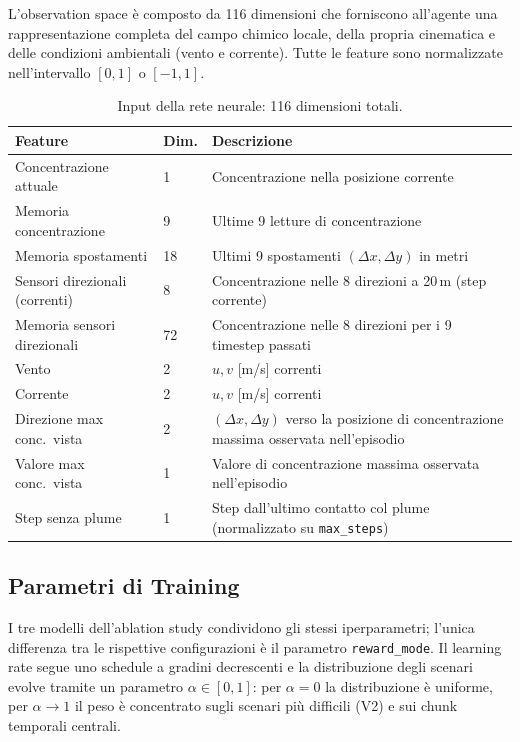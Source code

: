 \documentclass[12pt, a4paper]{article}
\begin{document}
L'observation space \`e composto da 116 dimensioni che forniscono all'agente
una rappresentazione completa del campo chimico locale, della propria cinematica
e delle condizioni ambientali (vento e corrente).
Tutte le feature sono normalizzate nell'intervallo $[0,1]$ o $[-1,1]$.

\begin{table}[htbp]
\centering
\small
\begin{tabular}{L{4.5cm} C{1.2cm} L{9cm}}
\toprule
\textbf{Feature} & \textbf{Dim.} & \textbf{Descrizione} \\
\midrule
Concentrazione attuale & 1 & Concentrazione nella posizione corrente \\
Memoria concentrazione & 9 & Ultime 9 letture di concentrazione \\
Memoria spostamenti & 18 & Ultimi 9 spostamenti $(\Delta x, \Delta y)$ in metri \\
Sensori direzionali (correnti) & 8 & Concentrazione nelle 8 direzioni a 20\,m (step corrente) \\
Memoria sensori direzionali & 72 & Concentrazione nelle 8 direzioni per i 9 timestep passati \\
Vento & 2 & $u, v$ [m/s] correnti \\
Corrente & 2 & $u, v$ [m/s] correnti \\
Direzione max conc.\ vista & 2 & $(\Delta x, \Delta y)$ verso la posizione di concentrazione massima osservata nell'episodio \\
Valore max conc.\ vista & 1 & Valore di concentrazione massima osservata nell'episodio \\
Step senza plume & 1 & Step dall'ultimo contatto col plume (normalizzato su \texttt{max\_steps}) \\
\bottomrule
\end{tabular}
\caption{Input della rete neurale: 116 dimensioni totali.}
\end{table}

\subsection{Parametri di Training}

I tre modelli dell'ablation study condividono gli stessi iperparametri; l'unica
differenza tra le rispettive configurazioni \`e il parametro \texttt{reward\_mode}.
Il learning rate segue uno schedule a gradini decrescenti e la distribuzione degli
scenari evolve tramite un parametro $\alpha \in [0,1]$: per $\alpha = 0$ la
distribuzione \`e uniforme, per $\alpha \to 1$ il peso \`e concentrato sugli scenari
pi\`u difficili (V2) e sui chunk temporali centrali.
\end{document}
